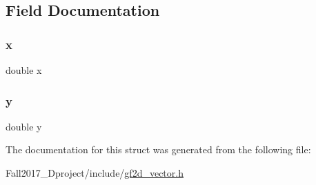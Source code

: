 \subsection{Field Documentation}
\mbox{\label{struct_vector2_d_af88b946fb90d5f08b5fb740c70e98c10}} 
\subsubsection{\texorpdfstring{x}{x}}
{\footnotesize\ttfamily double x}

\mbox{\label{struct_vector2_d_ab927965981178aa1fba979a37168db2a}} 
\subsubsection{\texorpdfstring{y}{y}}
{\footnotesize\ttfamily double y}



The documentation for this struct was generated from the following file\+:\begin{DoxyCompactItemize}
\item 
Fall2017\+\_\+Dproject/include/\hyperlink{gf2d__vector_8h}{gf2d\+\_\+vector.\+h}\end{DoxyCompactItemize}
